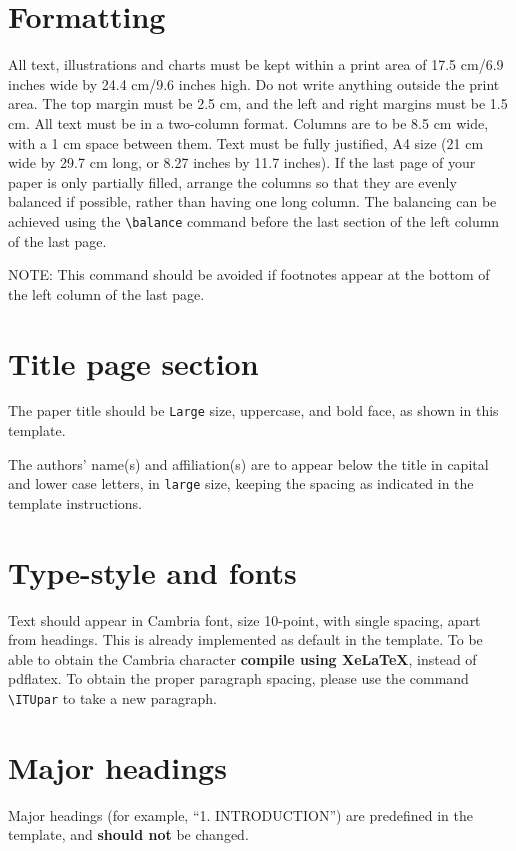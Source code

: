 \documentclass[10pt,a4paper,twocolumn]{article}
\newcommand{\ITUnote}[1]{\begin{small} \ITUpar NOTE: #1 \end{small}}
\newcommand{\ITUpar}{\vspace{8pt}\par}
\begin{document}
\section{Formatting}
\label{sec:sec2}
All text, illustrations and charts must be kept within a print area of 17.5 cm/6.9 inches wide by 24.4 cm/9.6 inches high.
Do not write anything outside the print area.
The top margin must be 2.5 cm, and the left and right margins must be 1.5 cm.
All text must be in a two-column format.
Columns are to be 8.5 cm wide, with a 1 cm space between them.
Text must be fully justified, A4 size (21 cm wide by 29.7 cm long, or 8.27 inches by 11.7 inches).
If the last page of your paper is only partially filled, arrange the columns so that they are evenly balanced if possible, rather than having one long column.
The balancing can be achieved using the \texttt{\textbackslash balance} command before the last section of the left column of the last page.
\ITUnote{This command should be avoided if footnotes appear at the bottom of the left column of the last page.}


\section{Title page section}
\label{sec:sec3}
The paper title should be \texttt{Large} size, uppercase, and bold face, as shown in this template.\ITUpar
The authors' name(s) and affiliation(s) are to appear below the title in capital and lower case letters, in \texttt{large} size, keeping the spacing as indicated in the template instructions.


\section{Type-style and fonts}
\label{sec:sec4}
Text should appear in Cambria font, size 10-point, with single spacing, apart from headings.
This is already implemented as default in the template.
To be able to obtain the Cambria character \textbf{compile using XeLaTeX}, instead of pdflatex.
To obtain the proper paragraph spacing, please use the command \texttt{\textbackslash ITUpar} to take a new paragraph.\ITUpar


\section{Major headings}
\label{sec:sec5}
Major headings (for example, ``1. INTRODUCTION'') are predefined in the template, and \textbf{should not} be changed.
\end{document}
